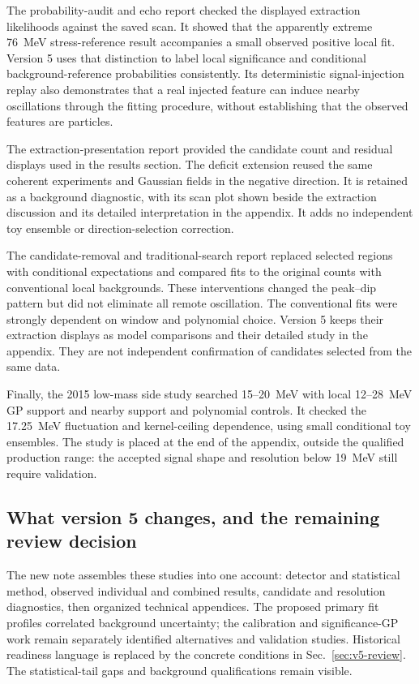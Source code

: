 The probability-audit and echo report checked the displayed extraction
likelihoods against the saved scan. It showed that the apparently extreme
76~MeV stress-reference result accompanies a small observed positive
local fit. Version 5 uses that distinction to label local significance
and conditional background-reference probabilities consistently. Its
deterministic signal-injection replay also demonstrates that a real
injected feature can induce nearby oscillations through the fitting
procedure, without establishing that the observed features are particles.

The extraction-presentation report provided the candidate count and
residual displays used in the results section. The deficit extension
reused the same coherent experiments and Gaussian fields in the negative
direction. It is retained as a background diagnostic, with its scan plot
shown beside the extraction discussion and its detailed interpretation
in the appendix. It adds no independent toy ensemble or direction-selection
correction.

The candidate-removal and traditional-search report replaced selected
regions with conditional expectations and compared fits to the original
counts with conventional local backgrounds. These interventions changed
the peak--dip pattern but did not eliminate all remote oscillation.
The conventional fits were strongly dependent on window and polynomial
choice. Version 5 keeps their extraction displays as model comparisons
and their detailed study in the appendix. They are not independent
confirmation of candidates selected from the same data.

Finally, the 2015 low-mass side study searched 15--20~MeV with local
12--28~MeV GP support and nearby support and polynomial controls.
It checked the 17.25~MeV fluctuation and kernel-ceiling dependence,
using small conditional toy ensembles. The study is placed at the end
of the appendix, outside the qualified production range: the accepted
signal shape and resolution below 19~MeV still require validation.

\subsection{What version 5 changes, and the remaining review decision}
The new note assembles these studies into one account: detector and
statistical method, observed individual and combined results, candidate
and resolution diagnostics, then organized technical appendices.
The proposed primary fit profiles correlated background uncertainty;
the calibration and significance-GP work remain separately identified
alternatives and validation studies. Historical readiness language is
replaced by the concrete conditions in Sec.~\ref{sec:v5-review}.
The statistical-tail gaps and background qualifications remain visible.

